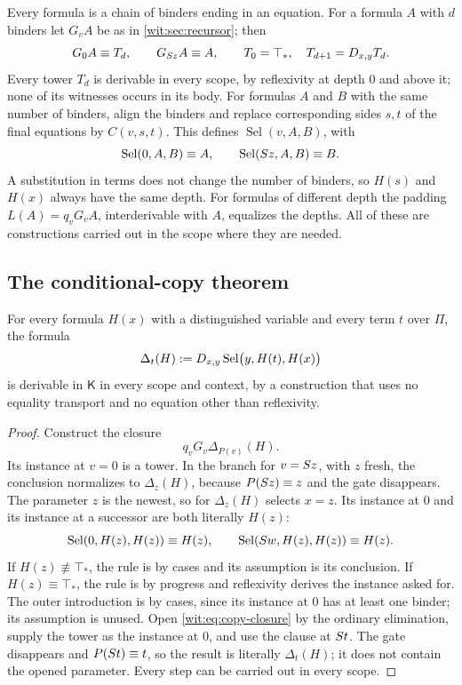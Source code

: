 Every formula is a chain of binders ending in an equation.  For a formula
$A$ with $d$ binders let $G_vA$ be as in \cref{wit:sec:recursor}; then
\[
 G_0A\equiv T_d,\qquad G_{S z}A\equiv A,\qquad
 T_0=\top_{*},\quad T_{d+1}=D_{x,y}T_d .
\]
Every tower $T_d$ is derivable in every scope, by reflexivity at depth $0$
and  above it; none of its witnesses occurs in its body.
For formulas $A$ and $B$ with the same number of binders, align the binders
and replace corresponding sides $s,t$ of the final equations by $C(v,s,t)$.
This defines $\operatorname{Sel}(v,A,B)$, with
\[
 \operatorname{Sel}(0,A,B)\equiv A,\qquad
 \operatorname{Sel}(S z,A,B)\equiv B .
\]
A substitution in terms does not change the number of binders, so $H(s)$
and $H(x)$ always have the same depth.  For formulas of different depth the
padding $L(A)=q_vG_vA$, interderivable with $A$, equalizes the depths.  All
of these are constructions carried out in the scope where they are needed.

\subsection{The conditional-copy theorem}

\begin{theorem}
\label{wit:thm:copy}
For every formula $H(x)$ with a distinguished variable and every term $t$
over $\Pi$, the formula
\[
 \Delta_t(H)\mathrel{:=}D_{x,y}\operatorname{Sel}\bigl(y,H(t),H(x)\bigr)
\]
is derivable in $\mathsf{K}$ in every scope and context, by a construction
that uses no equality transport and no equation other than reflexivity.
\end{theorem}

\begin{proof}
Construct the closure
\begin{equation}
 q_vG_v\Delta_{P(v)}(H).
 \label{wit:eq:copy-closure}
\end{equation}
Its instance at $v=0$ is a tower.  In the branch for $v=S z$, with $z$
fresh, the conclusion normalizes to $\Delta_z(H)$, because
$P(S z)\equiv z$ and the gate disappears.  The parameter $z$ is the
newest, so  for $\Delta_z(H)$ selects $x=z$.  Its instance
at $0$ and its instance at a successor are both literally $H(z)$:
\[
 \operatorname{Sel}(0,H(z),H(z))\equiv H(z),\qquad
 \operatorname{Sel}(S w,H(z),H(z))\equiv H(z).
\]
If $H(z)\not\equiv\top_{*}$, the rule is by cases and its assumption is its
conclusion.  If $H(z)\equiv\top_{*}$, the rule is by progress and
reflexivity derives the instance asked for.  The outer introduction is by
cases, since its instance at $0$ has at least one binder; its assumption is
unused.  Open \eqref{wit:eq:copy-closure} by the ordinary elimination,
supply the tower as the instance at $0$, and use the clause at $S t$.
The gate disappears and $P(S t)\equiv t$, so the result is literally
$\Delta_t(H)$; it does not contain the opened parameter.  Every step can be
carried out in every scope.
\end{proof}

